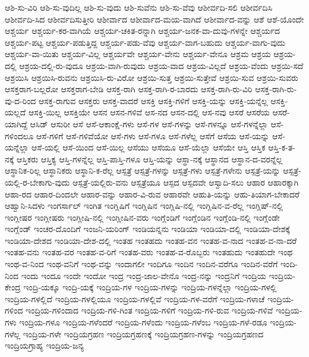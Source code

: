 {ಆಶಿ-ಸು-ವಿರಿ
ಆಶಿ-ಸು-ವುದಿಲ್ಲ
ಆಶಿ-ಸು-ವುದು
ಆಶಿ-ಸುವೆನು
ಆಶಿ-ಸು-ವೆವು
ಆಶೀರ್ವದಿ-ಸಲಿ
ಆಶೀರ್ವದಿಸಿ
ಆಶೀರ್ವದಿ-ಸಿದ
ಆಶೀರ್ವದಿಸುತ್ತೀರಿ
ಆಶೀರ್ವಾದ
ಆಶೀರ್ವಾದ-ಮಯ-ವಾಗಿದೆ
ಆಶೀರ್ವಾದ-ವನ್ನು
ಆಶೆ
ಆಶೆ-ಯೊಂದೇ
ಆಶ್ಚರ್ಯ
ಆಶ್ಚರ್ಯ-ಕರ-ವಾಗಿಯೆ
ಆಶ್ಚರ್ಯ-ಚಕಿತ-ರನ್ನಾಗಿ
ಆಶ್ಚರ್ಯ-ಜನಕ-ವಾ-ದುವು-ಗಳನ್ನೇ
ಆಶ್ಚರ್ಯದ
ಆಶ್ಚರ್ಯ-ಪಟ್ಟ
ಆಶ್ಚರ್ಯ-ಪಡುತ್ತಿದ್ದ
ಆಶ್ಚರ್ಯ-ಪಡು-ವೆವು
ಆಶ್ಚರ್ಯ-ವಾಗ-ಬಹುದು
ಆಶ್ಚರ್ಯ-ವಾಗು-ವುದು
ಆಶ್ಚರ್ಯ-ವಾ-ಯಿತು
ಆಶ್ಚರ್ಯ-ವಿಲ್ಲ
ಆಶ್ಚರ್ಯವೇ
ಆಶ್ಚರ್ಯ-ವೇನು
ಆಶ್ಚರ್ಯ-ವೇನೂ
ಆಶ್ರಮ
ಆಶ್ರಯ
ಆಶ್ರಯ-ದಲ್ಲಿ
ಆಶ್ರಯ-ದಲ್ಲಿ-ರು-ವುದೂ
ಆಶ್ರಯ-ವಾಗಿ-ರುವುದು
ಆಶ್ರಯ-ವಾದ
ಆಶ್ರಯ-ವಿಲ್ಲದೆ
ಆಶ್ರಯ-ವೆಂದು
ಆಶ್ರಯಿ-ಸದೆ
ಆಶ್ರಯಿಸಿ
ಆಶ್ರಯಿಸಿ-ರುವನು
ಆಶ್ರಯಿಸಿ-ರು-ವಿರೋ
ಆಶ್ರಯಿ-ಸುತ್ತ
ಆಶ್ರಯಿ-ಸುತ್ತೇವೆ
ಆಶ್ರಯಿ-ಸುವ
ಆಶ್ರಯಿ-ಸುವರು
ಆಸಕ್ತರಾಗ-ಬಲ್ಲರೋ
ಆಸಕ್ತರಾಗ-ಬೇಡಿ
ಆಸಕ್ತ-ರಾಗಿ
ಆಸಕ್ತ-ರಾಗಿ-ರ-ಬಾರದು
ಆಸಕ್ತ-ರಾಗಿ-ರು-ವಿರಿ
ಆಸಕ್ತ-ರಾಗಿ-ರು-ವು-ದ-ರಿಂದ
ಆಸಕ್ತ-ರಾಗುವ
ಆಸಕ್ತರು
ಆಸಕ್ತ-ವಾದರೆ
ಆಸಕ್ತಿ
ಆಸಕ್ತಿ-ಗಳಿಗೆ
ಆಸಕ್ತಿ-ಯನ್ನು
ಆಸಕ್ತಿ-ಯನ್ನೆಲ್ಲ
ಆಸಕ್ತಿ-ಯಲ್ಲದೆ
ಆಸಕ್ತಿ-ಯಿಲ್ಲ
ಆಸಕ್ತಿಯೇ
ಆಸನ
ಆಸನ-ಗಳಿವೆ
ಆಸ-ನದ
ಆಸನ-ದಲ್ಲಿ
ಆಸ-ನವು
ಆಸರೆ
ಆಸರೆಯ
ಆಸರೆ-ಯಾಗಿದ್ದೆ
ಆಸಿಡ್
ಆಸುರೀ
ಆಸೆ
ಆಸೆ-ಆಕಾಂಕ್ಷೆ-ಗಳು
ಆಸೆ-ಗಳ
ಆಸೆ-ಗಳನ್ನು
ಆಸೆ-ಗಳನ್ನೂ
ಆಸೆ-ಗಳನ್ನೆಲ್ಲಾ
ಆಸೆ-ಗಳಿಂದಲೂ
ಆಸೆ-ಗಳಿಗೆ
ಆಸೆ-ಗಳಿವೆಯೋ
ಆಸೆ-ಗಳು
ಆಸೆ-ಗಳೂ
ಆಸೆ-ಗಳೆಲ್ಲ
ಆಸೆಗೆ
ಆಸೆಯ
ಆಸೆ-ಯನ್ನು
ಆಸೆ-ಯನ್ನೆಲ್ಲಾ
ಆಸೆ-ಯಲ್ಲಿ
ಆಸೆ-ಯಿಂದ
ಆಸೆ-ಯಿಲ್ಲ
ಆಸೆಯು
ಆಸೆಯೂ
ಆಸೆ-ಯೆಲ್ಲಾ
ಆಸೆಯೇ
ಆಸ್ತಿ
ಆಸ್ತಿಕ
ಆಸ್ತಿ-ಕ-ತ-ನಕ್ಕೆ
ಆಸ್ತಿಕರು
ಆಸ್ತಿಕ್ಯ
ಆಸ್ತಿ-ಗಳನ್ನೆಲ್ಲ
ಆಸ್ತಿ-ಪಾಸ್ತಿ-ಗಳೂ
ಆಸ್ತಿ-ಯನ್ನು
ಆಸ್ಥಾ-ನಕ್ಕೆ
ಆಸ್ಥಾನದ
ಆಸ್ಥಾನ-ದ-ವರನ್ನೆಲ್ಲ
ಆಸ್ಥಾನಿಕ-ರಿಲ್ಲ
ಆಸ್ಥಾನಿಕರು
ಆಸ್ಥಾನಿ-ಕ-ರೆಲ್ಲ
ಆಸ್ಪತ್ರೆ
ಆಸ್ಪತ್ರೆ-ಗಳನ್ನು
ಆಸ್ಪತ್ರೆ-ಗಳು
ಆಸ್ಪತ್ರೆ-ಗಳೇನು
ಆಸ್ಪತ್ರೆ-ಯನ್ನು
ಆಸ್ಪತ್ರೆ-ಯಲ್ಲಿ-ರ-ಬೇಕಾಗು-ವುದು
ಆಸ್ಪತ್ರೆ-ಯಲ್ಲಿರು-ವನು
ಆಸ್ಪತ್ರೆಯೂ
ಆಸ್ಪದ
ಆಸ್ಪದವೇ
ಆಸ್ವಾದಿ-ಸಲು
ಆಹಾರ
ಆಹಾರಕ್ಕಾಗಿ
ಆಹಾ-ರದ
ಆಹಾರ-ದಿಂದಲೇ
ಆಹಾರ-ವನ್ನು
ಆಹಾರ-ವಿ-ರುವ
ಆಹಾರವೇ
ಆಹುತಿ-ಯನ್ನು
ಆಹು-ತಿಯಾಗ-ಬೇಕಾದರೆ
ಆಹ್ವಾನಿ-ಸಿದಳು
ಇಂಗರ್ಸಾಲ್
ಇಂಗಿತ
ಇಂಗ್ಲಿಷಿಗೆ
ಇಂಗ್ಲಿಷಿನ
ಇಂಗ್ಲಿಷಿ-ನಲ್ಲಿ
ಇಂಗ್ಲಿಷಿನ-ವ-ರೆಲ್ಲ
ಇಂಗ್ಲಿಷ್-ನಲ್ಲಿ
ಇಂಗ್ಲೀಷರ
ಇಂಗ್ಲೀಷರು
ಇಂಗ್ಲೀಷಿ-ನಲ್ಲಿ
ಇಂಗ್ಲೀಷಿನ-ವರು
ಇಂಗ್ಲೆಂಡಿಗೆ
ಇಂಗ್ಲೆಂಡಿನ
ಇಂಗ್ಲೆಂಡಿ-ನಲ್ಲಿ
ಇಂಗ್ಲೆಂಡೇ
ಇಂಗ್ಲೆಂಡ್
ಇಂಚರ-ದೊಂದಿಗೆ
ಇಂಜನಿ-ಯರಿಂಗ್
ಇಂಡಿಯನ್ನನು
ಇಂಡಿಯಾ
ಇಂಡಿಯಾ-ದಲ್ಲಿ
ಇಂಡಿಯಾ-ದೇಶಕ್ಕೆ
ಇಂಡಿಯಾ-ದೇಶದ
ಇಂಡಿಯಾ-ದೇಶ-ದಲ್ಲಿ
ಇಂತಹ
ಇಂತಹದು
ಇಂತಹ-ವನ
ಇಂತಹ-ವ-ನಾದ
ಇಂತಹ-ವ-ನಾ-ದರೆ
ಇಂತಹ-ವನು
ಇಂತಹ-ವರ
ಇಂತಹ-ವ-ರಿಗೆ
ಇಂತಹ-ವರು
ಇಂತಹ-ವ-ರೊಬ್ಬರು
ಇಂತಹುದು
ಇಂತಹುದೇ
ಇಂಥ
ಇಂಥ-ವ-ನಿಂದ
ಇಂಥ-ವನಿಗೆ
ಇಂಥ-ವನ್ನು
ಇಂದಾಗಲೀ
ಇಂದಿಗೂ
ಇಂದಿನ
ಇಂದಿನ-ವರೆಗೂ
ಇಂದಿನ-ವರೆಗೆ
ಇಂದಿ-ನಿಂದ
ಇಂದು
ಇಂದೂ
ಇಂದೇ
ಇಂದೋ
ಇಂದ್ರ
ಇಂದ್ರ-ಜಾಲ-ವೇನೊ
ಇಂದ್ರ-ನನ್ನು
ಇಂದ್ರನಿಗೆ
ಇಂದ್ರಿಯ
ಇಂದ್ರಿಯ-ಕೇಂದ್ರ
ಇಂದ್ರಿ-ಯಕ್ಕೂ
ಇಂದ್ರಿ-ಯಕ್ಕೆ
ಇಂದ್ರಿಯ-ಗಳ
ಇಂದ್ರಿಯ-ಗಳನ್ನು
ಇಂದ್ರಿಯ-ಗಳನ್ನೆಲ್ಲಾ
ಇಂದ್ರಿಯ-ಗಳಲ್ಲಿ
ಇಂದ್ರಿಯ-ಗಳಲ್ಲಿದೆ
ಇಂದ್ರಿಯ-ಗಳಲ್ಲಿಯೂ
ಇಂದ್ರಿಯ-ಗಳಲ್ಲಿವೆ
ಇಂದ್ರಿಯ-ಗಳ-ವರೆಗೆ
ಇಂದ್ರಿಯ-ಗಳಾಚೆ
ಇಂದ್ರಿಯ-ಗಳಿಂದ
ಇಂದ್ರಿಯ-ಗಳಿಂದಾದ
ಇಂದ್ರಿಯ-ಗಳಿ-ಗಿಂತ
ಇಂದ್ರಿಯ-ಗಳಿಗೆ
ಇಂದ್ರಿಯ-ಗಳಿ-ರುವ
ಇಂದ್ರಿಯ-ಗಳಿವೆ
ಇಂದ್ರಿಯ-ಗಳು
ಇಂದ್ರಿಯ-ಗಳೂ
ಇಂದ್ರಿಯ-ಗಳೆಂದರೆ
ಇಂದ್ರಿಯ-ಗಳೆಂದು
ಇಂದ್ರಿಯ-ಗಳೆಂಬ
ಇಂದ್ರಿಯ-ಗಳೆ-ರಡೂ
ಇಂದ್ರಿಯ-ಗಳೆಲ್ಲ
ಇಂದ್ರಿಯ-ಗಳೇ
ಇಂದ್ರಿಯಗ್ರಹಣ
ಇಂದ್ರಿಯಗ್ರಹಣಕ್ಕೆ
ಇಂದ್ರಿಯಗ್ರಹಣ-ಗಳನ್ನು
ಇಂದ್ರಿಯಗ್ರಹಣದ
ಇಂದ್ರಿಯಗ್ರಾಹ್ಯ
ಇಂದ್ರಿಯ-ಜನ್ಯ
}
